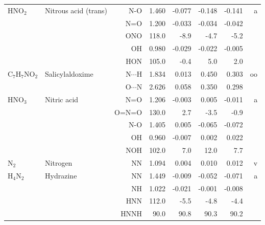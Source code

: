 \begin{table}
\begin{center}
\begin{tabular}{llrrrrrr}
 HNO$_2$        & Nitrous acid (trans)               &N-O           &     1.460   &    -0.077 &    -0.148 &    -0.141 &     a \\
             &                                    &N=O           &     1.200   &    -0.033 &    -0.034 &    -0.042 &       \\
             &                                    &ONO         &     118.0   &      -8.9 &      -4.7 &      -5.2   &       \\
             &                                    &OH            &     0.980   &    -0.029 &    -0.022 &    -0.005 &       \\
             &                                    &HON         &     105.0   &      -0.4 &       5.0 &       2.0   &       \\
 C$_7$H$_7$NO$_2$     & Salicylaldoxime                    &N$\cdots$H    &     1.834   &     0.013 &     0.450 &     0.303 &    oo \\
             &                                    &O$\cdots$N    &     2.626   &     0.058 &     0.350 &     0.298 &       \\
 HNO$_3$        & Nitric acid                        &N=O           &     1.206   &    -0.003 &     0.005 &    -0.011 &     a \\
             &                                    &O=N=O       &     130.0   &       2.7 &      -3.5 &      -0.9   &       \\
             &                                    &N-O           &     1.405   &     0.005 &    -0.065 &    -0.072 &       \\
             &                                    &OH            &     0.960   &    -0.007 &     0.002 &     0.022 &       \\
             &                                    &NOH         &     102.0   &       7.0 &      12.0 &       7.7   &       \\
 N$_2$          & Nitrogen                           &NN            &     1.094   &     0.004 &     0.010 &     0.012 &     v \\
 H$_4$N$_2$        & Hydrazine                          &NN            &     1.449   &    -0.009 &    -0.052 &    -0.071 &     a \\
             &                                    &NH            &     1.022   &    -0.021 &    -0.001 &    -0.008 &       \\
             &                                    &HNN         &     112.0   &      -5.5 &      -4.8 &      -4.4   &       \\
             &                                    &HNNH        &      90.0   &      90.8 &      90.3 &      90.2   &       \\
\hline
\end{tabular}
\end{center}
\end{table}
\clearpage

